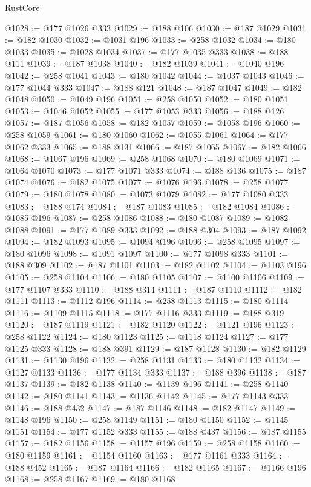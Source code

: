 \begin{lexlean}{RustCore}
\begin{coremodule}
@1028 := @177 @1026 @333
@1029 := @188 @106
@1030 := @187 @1029
@1031 := @182 @1030
@1032 := @1031 @196
@1033 := @258 @1032
@1034 := @180 @1033
@1035 := @1028 @1034
@1037 := @177 @1035 @333
@1038 := @188 @111
@1039 := @187 @1038
@1040 := @182 @1039
@1041 := @1040 @196
@1042 := @258 @1041
@1043 := @180 @1042
@1044 := @1037 @1043
@1046 := @177 @1044 @333
@1047 := @188 @121
@1048 := @187 @1047
@1049 := @182 @1048
@1050 := @1049 @196
@1051 := @258 @1050
@1052 := @180 @1051
@1053 := @1046 @1052
@1055 := @177 @1053 @333
@1056 := @188 @126
@1057 := @187 @1056
@1058 := @182 @1057
@1059 := @1058 @196
@1060 := @258 @1059
@1061 := @180 @1060
@1062 := @1055 @1061
@1064 := @177 @1062 @333
@1065 := @188 @131
@1066 := @187 @1065
@1067 := @182 @1066
@1068 := @1067 @196
@1069 := @258 @1068
@1070 := @180 @1069
@1071 := @1064 @1070
@1073 := @177 @1071 @333
@1074 := @188 @136
@1075 := @187 @1074
@1076 := @182 @1075
@1077 := @1076 @196
@1078 := @258 @1077
@1079 := @180 @1078
@1080 := @1073 @1079
@1082 := @177 @1080 @333
@1083 := @188 @174
@1084 := @187 @1083
@1085 := @182 @1084
@1086 := @1085 @196
@1087 := @258 @1086
@1088 := @180 @1087
@1089 := @1082 @1088
@1091 := @177 @1089 @333
@1092 := @188 @304
@1093 := @187 @1092
@1094 := @182 @1093
@1095 := @1094 @196
@1096 := @258 @1095
@1097 := @180 @1096
@1098 := @1091 @1097
@1100 := @177 @1098 @333
@1101 := @188 @309
@1102 := @187 @1101
@1103 := @182 @1102
@1104 := @1103 @196
@1105 := @258 @1104
@1106 := @180 @1105
@1107 := @1100 @1106
@1109 := @177 @1107 @333
@1110 := @188 @314
@1111 := @187 @1110
@1112 := @182 @1111
@1113 := @1112 @196
@1114 := @258 @1113
@1115 := @180 @1114
@1116 := @1109 @1115
@1118 := @177 @1116 @333
@1119 := @188 @319
@1120 := @187 @1119
@1121 := @182 @1120
@1122 := @1121 @196
@1123 := @258 @1122
@1124 := @180 @1123
@1125 := @1118 @1124
@1127 := @177 @1125 @333
@1128 := @188 @391
@1129 := @187 @1128
@1130 := @182 @1129
@1131 := @1130 @196
@1132 := @258 @1131
@1133 := @180 @1132
@1134 := @1127 @1133
@1136 := @177 @1134 @333
@1137 := @188 @396
@1138 := @187 @1137
@1139 := @182 @1138
@1140 := @1139 @196
@1141 := @258 @1140
@1142 := @180 @1141
@1143 := @1136 @1142
@1145 := @177 @1143 @333
@1146 := @188 @432
@1147 := @187 @1146
@1148 := @182 @1147
@1149 := @1148 @196
@1150 := @258 @1149
@1151 := @180 @1150
@1152 := @1145 @1151
@1154 := @177 @1152 @333
@1155 := @188 @437
@1156 := @187 @1155
@1157 := @182 @1156
@1158 := @1157 @196
@1159 := @258 @1158
@1160 := @180 @1159
@1161 := @1154 @1160
@1163 := @177 @1161 @333
@1164 := @188 @452
@1165 := @187 @1164
@1166 := @182 @1165
@1167 := @1166 @196
@1168 := @258 @1167
@1169 := @180 @1168

\end{coremodule}
\end{lexlean}
